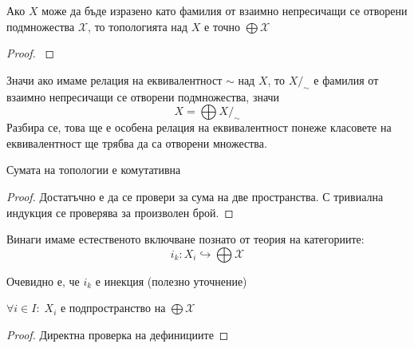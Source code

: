 \begin{proposition}
    Ако $X$ може да бъде изразено като фамилия от взаимно непресичащи се отворени подмножества $\mathcal X$, то топологията над $X$ е точно $\bigoplus \mathcal X$
\end{proposition}
\begin{proof}
    \cite[p.~75]{engelking1989general}
\end{proof}
\begin{corollary}
    Значи ако имаме релация на еквивалентност $\sim$ над $X$, то $X/_\sim$ е фамилия от взаимно непресичащи се отворени подмножества, значи
    \begin{equation*}
        X = \bigoplus X/_\sim
    \end{equation*}
    Разбира се, това ще е особена релация на еквивалентност понеже класовете на еквивалентност ще трябва да са отворени множества.
\end{corollary}

\begin{proposition}
    Сумата на топологии е комутативна
\end{proposition}
\begin{proof}
    Достатъчно е да се провери за сума на две пространства. С тривиална индукция се проверява за произволен брой.
\end{proof}

\begin{notation}
    Винаги имаме естественото включване познато от теория на категориите:
    \begin{equation*}
        i_k : X_i \hookrightarrow \bigoplus \mathcal X
    \end{equation*}
\end{notation}
Очевидно е, че $i_k$ е инекция (полезно уточнение)
\begin{proposition}
    $\forall i \in I:\; X_i$ е подпространство на $\bigoplus \mathcal X$
\end{proposition}
\begin{proof}
    Директна проверка на дефинициите
\end{proof}

